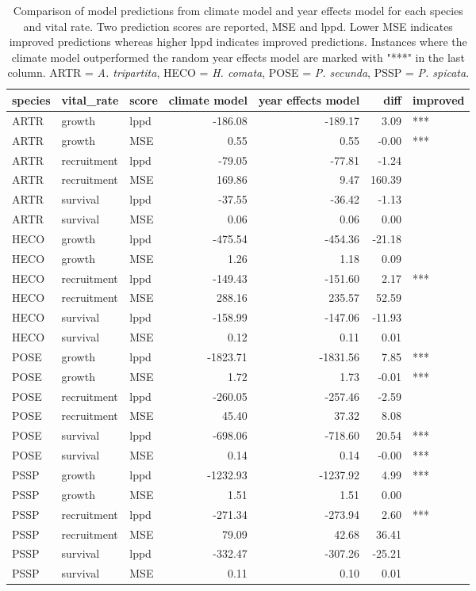 \begin{table}[ht]
\centering
\caption{Comparison of model predictions from climate model and year effects model for each species and vital rate.  Two prediction scores are reported, MSE and lppd. Lower MSE indicates improved predictions whereas higher lppd indicates improved predictions.  Instances where the climate model outperformed the random year effects model are marked with "***" in the last column. ARTR = \textit{A. tripartita}, HECO = \textit{H. comata}, POSE = \textit{P. secunda}, PSSP = \textit{P. spicata}.} 
\label{table:overallPreds}
\begin{tabular}{lllrrrl}
  \hline
species & vital\_rate & score & climate model & year effects model & diff & improved \\ 
  \hline
ARTR & growth & lppd & -186.08 & -189.17 & 3.09 & *** \\ 
  ARTR & growth & MSE & 0.55 & 0.55 & -0.00 & *** \\ 
  ARTR & recruitment & lppd & -79.05 & -77.81 & -1.24 &  \\ 
  ARTR & recruitment & MSE & 169.86 & 9.47 & 160.39 &  \\ 
  ARTR & survival & lppd & -37.55 & -36.42 & -1.13 &  \\ 
  ARTR & survival & MSE & 0.06 & 0.06 & 0.00 &  \\ 
  HECO & growth & lppd & -475.54 & -454.36 & -21.18 &  \\ 
  HECO & growth & MSE & 1.26 & 1.18 & 0.09 &  \\ 
  HECO & recruitment & lppd & -149.43 & -151.60 & 2.17 & *** \\ 
  HECO & recruitment & MSE & 288.16 & 235.57 & 52.59 &  \\ 
  HECO & survival & lppd & -158.99 & -147.06 & -11.93 &  \\ 
  HECO & survival & MSE & 0.12 & 0.11 & 0.01 &  \\ 
  POSE & growth & lppd & -1823.71 & -1831.56 & 7.85 & *** \\ 
  POSE & growth & MSE & 1.72 & 1.73 & -0.01 & *** \\ 
  POSE & recruitment & lppd & -260.05 & -257.46 & -2.59 &  \\ 
  POSE & recruitment & MSE & 45.40 & 37.32 & 8.08 &  \\ 
  POSE & survival & lppd & -698.06 & -718.60 & 20.54 & *** \\ 
  POSE & survival & MSE & 0.14 & 0.14 & -0.00 & *** \\ 
  PSSP & growth & lppd & -1232.93 & -1237.92 & 4.99 & *** \\ 
  PSSP & growth & MSE & 1.51 & 1.51 & 0.00 &  \\ 
  PSSP & recruitment & lppd & -271.34 & -273.94 & 2.60 & *** \\ 
  PSSP & recruitment & MSE & 79.09 & 42.68 & 36.41 &  \\ 
  PSSP & survival & lppd & -332.47 & -307.26 & -25.21 &  \\ 
  PSSP & survival & MSE & 0.11 & 0.10 & 0.01 &  \\ 
   \hline
\end{tabular}
\end{table}
